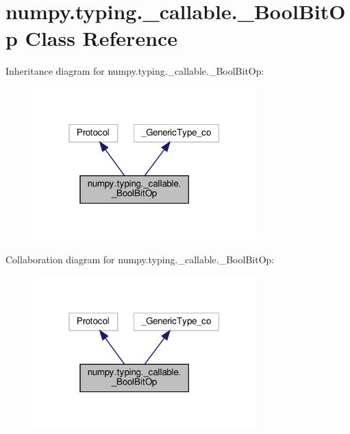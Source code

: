 \hypertarget{classnumpy_1_1typing_1_1__callable_1_1__BoolBitOp}{}\section{numpy.\+typing.\+\_\+callable.\+\_\+\+Bool\+Bit\+Op Class Reference}
\label{classnumpy_1_1typing_1_1__callable_1_1__BoolBitOp}


Inheritance diagram for numpy.\+typing.\+\_\+callable.\+\_\+\+Bool\+Bit\+Op\+:
\nopagebreak
\begin{figure}[H]
\begin{center}
\leavevmode
\includegraphics[width=244pt]{classnumpy_1_1typing_1_1__callable_1_1__BoolBitOp__inherit__graph}
\end{center}
\end{figure}


Collaboration diagram for numpy.\+typing.\+\_\+callable.\+\_\+\+Bool\+Bit\+Op\+:
\nopagebreak
\begin{figure}[H]
\begin{center}
\leavevmode
\includegraphics[width=244pt]{classnumpy_1_1typing_1_1__callable_1_1__BoolBitOp__coll__graph}
\end{center}
\end{figure}
